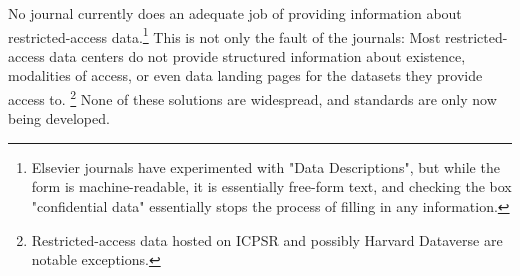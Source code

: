 \documentclass[PP]{AEA}
\begin{document}

No journal currently does an adequate job of providing information about restricted-access data.\footnote{Elsevier journals have experimented with "Data Descriptions", but while the form is machine-readable, it is essentially free-form text, and checking the box "confidential data" essentially stops the process of filling in any information.} This is not only the fault of the journals: Most restricted-access data centers do not provide structured information about existence, modalities of access, or even data landing pages for the datasets they provide access to.%
\footnote{Restricted-access data hosted on ICPSR and possibly Harvard Dataverse are notable exceptions.} 
None of these solutions are widespread, and standards are only now being developed.


%
\end{document}
